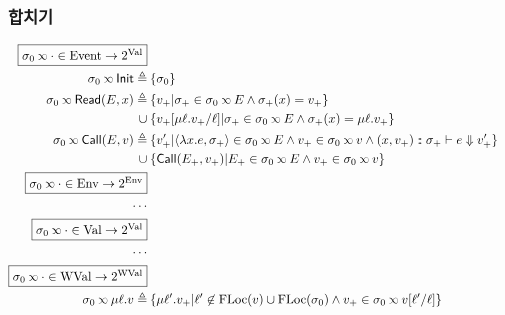 \documentclass{beamer}
\begin{document}
\begin{frame}
	\frametitle{합치기}
	\footnotesize
	\begin{align*}
		\fbox{$\ctx_0\semlink\cdot\in\Event\rightarrow\pset{\Value}$}                                                                                                                        \\
		\ctx_0\semlink\InitE\triangleq           & \: \{\ctx_0\}                                                                                                                             \\
		\ctx_0\semlink\ReadE(\event,x)\triangleq & \: \{v_+|\ctx_+\in\ctx_0\semlink\event\land\ctx_+(x)=v_+\}                                                                                \\
		\cup                                     & \: \{v_+[\mu\ell.v_+/\ell]|\ctx_+\in\ctx_0\semlink E\land\ctx_+(x)=\mu\ell.v_+\}                                                          \\
		\ctx_0\semlink\CallE(\event,v)\triangleq & \: \{v_+'|\langle\lambda x.e,\ctx_+\rangle\in\ctx_0\semlink E\land v_+\in\ctx_0\semlink v\land(x,v_+)\cons\ctx_+\vdash e\Downarrow v_+'\} \\
		\cup                                     & \: \{\CallE(\event_+,v_+)|\event_+\in\ctx_0\semlink E\land v_+\in\ctx_0\semlink v\}                                                       \\
		\fbox{$\ctx_0\semlink\cdot\in\Ctx\rightarrow\pset{\Ctx}$}                                                                                                                            \\
		\cdots                                                                                                                                                                               \\
		\fbox{$\ctx_0\semlink\cdot\in\Value\rightarrow\pset{\Value}$}                                                                                                                        \\
		\cdots                                                                                                                                                                               \\
		\fbox{$\ctx_0\semlink\cdot\in\Walue\rightarrow\pset{\Walue}$}                                                                                                                        \\
		\ctx_0\semlink\mu\ell.v\triangleq        & \: \{\mu\ell'.v_+|\ell'\not\in\FLoc(v)\cup\FLoc(\ctx_0)\land v_+\in\ctx_0\semlink v[\ell'/\ell]\}
	\end{align*}
\end{frame}
\end{document}
